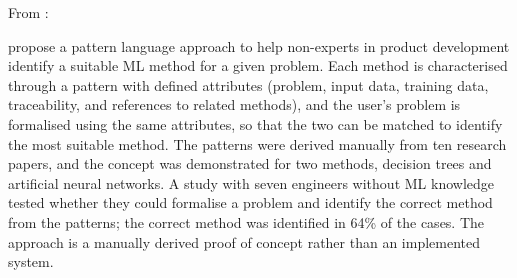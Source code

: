 From \parencite{sonntag2023pattern_ml_product_development}:

\textcite{sonntag2023pattern_ml_product_development} propose a pattern language approach to 
help non-experts in product development identify a suitable 
ML method for a given problem. Each method is characterised 
through a pattern with defined attributes (problem, input 
data, training data, traceability, and references to related 
methods), and the user's problem is formalised using the same 
attributes, so that the two can be matched to identify the 
most suitable method. The patterns were derived manually from 
ten research papers, and the concept was demonstrated for two 
methods, decision trees and artificial neural networks. A 
study with seven engineers without ML knowledge tested whether 
they could formalise a problem and identify the correct method 
from the patterns; the correct method was identified in 64\% 
of the cases. The approach is a manually derived proof of 
concept rather than an implemented system.

